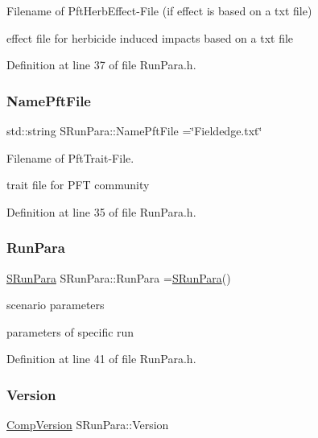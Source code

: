 Filename of Pft\+Herb\+Effect-\/\+File (if effect is based on a txt file) 

effect file for herbicide induced impacts based on a txt file 

Definition at line 37 of file Run\+Para.\+h.

\mbox{\label{struct_s_run_para_a9c98a63b836012a827e9fe97f440dae1}} 
\subsubsection{\texorpdfstring{NamePftFile}{NamePftFile}}
{\footnotesize\ttfamily std\+::string S\+Run\+Para\+::\+Name\+Pft\+File =\char`\"{}Fieldedge.\+txt\char`\"{}\hspace{0.3cm}{\ttfamily [static]}}



Filename of Pft\+Trait-\/\+File. 

trait file for P\+FT community 

Definition at line 35 of file Run\+Para.\+h.

\mbox{\label{struct_s_run_para_a3e7797ad861d93d0d7dd6ce23ff259b7}} 
\subsubsection{\texorpdfstring{RunPara}{RunPara}}
{\footnotesize\ttfamily \mbox{\hyperlink{struct_s_run_para}{S\+Run\+Para}} S\+Run\+Para\+::\+Run\+Para =\mbox{\hyperlink{struct_s_run_para}{S\+Run\+Para}}()\hspace{0.3cm}{\ttfamily [static]}}



scenario parameters 

parameters of specific run 

Definition at line 41 of file Run\+Para.\+h.

\mbox{\label{struct_s_run_para_a7958c75a9866d1ec4ce0230e3940363b}} 
\subsubsection{\texorpdfstring{Version}{Version}}
{\footnotesize\ttfamily \mbox{\hyperlink{_run_para_8h_aab4f91abfa6a0969e1cae8d7666e4d3a}{Comp\+Version}} S\+Run\+Para\+::\+Version}



